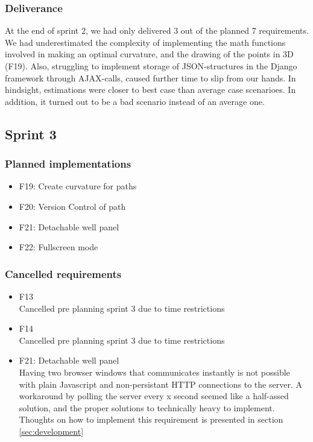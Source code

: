 \documentclass{report}
\begin{document}
\subsubsection{Deliverance}
At the end of sprint 2, we had only delivered 3 out of the planned 7 requirements. We had underestimated the complexity of implementing the math functions involved in making an optimal curvature, and the drawing of the points in 3D (F19). Also, struggling to implement storage of JSON-structures in the Django framework through AJAX-calls, caused further time to slip from our hands. In hindsight, estimations were closer to best case than average case scenarioes. In addition, it turned out to be a bad scenario instead of an average one.

\subsection{Sprint 3} \label{sec:sprint3_requirementsevolution}

\subsubsection{Planned implementations}

\begin{itemize}
    \item F19: Create curvature for paths
    \item F20: Version Control of path
    \item F21: Detachable well panel
    \item F22: Fullscreen mode
\end{itemize}

\subsubsection{Cancelled requirements}

\begin{itemize}
    \item F13 \\
    Cancelled pre planning sprint 3 due to time restrictions
    \item F14 \\
    Cancelled pre planning sprint 3 due to time restrictions
    \item F21: Detachable well panel \\
    Having two browser windows that communicates instantly is not possible with plain Javascript and non-persistant HTTP connections to the server. A workaround by polling the server every x second seemed like a half-assed solution, and the proper solutions to technically heavy to implement. Thoughts on how to implement this requirement is presented in section \ref{sec:development}
\end{itemize}
\end{document}
